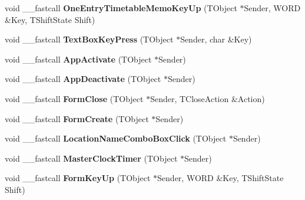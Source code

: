 \begin{DoxyCompactItemize}
\mbox{\label{class_t_interface_a8f417437f1683ddacce33c6e681571fc}} 
void \+\_\+\+\_\+fastcall {\bfseries One\+Entry\+Timetable\+Memo\+Key\+Up} (T\+Object $\ast$Sender, W\+O\+RD \&Key, T\+Shift\+State Shift)
\item 
\mbox{\label{class_t_interface_ad0ce61f7a8050fb57d19ebd049fa8b49}} 
void \+\_\+\+\_\+fastcall {\bfseries Text\+Box\+Key\+Press} (T\+Object $\ast$Sender, char \&Key)
\item 
\mbox{\label{class_t_interface_af99ae89b6c7a2d37bf49cf0b5fcc3f1f}} 
void \+\_\+\+\_\+fastcall {\bfseries App\+Activate} (T\+Object $\ast$Sender)
\item 
\mbox{\label{class_t_interface_a75f68c918750c0e007ea7a85d718e2ab}} 
void \+\_\+\+\_\+fastcall {\bfseries App\+Deactivate} (T\+Object $\ast$Sender)
\item 
\mbox{\label{class_t_interface_ad1418f26381a91c4333c3947585ed60e}} 
void \+\_\+\+\_\+fastcall {\bfseries Form\+Close} (T\+Object $\ast$Sender, T\+Close\+Action \&Action)
\item 
\mbox{\label{class_t_interface_a9cef18571e29b70d02ba9a92a830b3b8}} 
void \+\_\+\+\_\+fastcall {\bfseries Form\+Create} (T\+Object $\ast$Sender)
\item 
\mbox{\label{class_t_interface_a13fee6fa07e4a4e195e8b9c7dd303db0}} 
void \+\_\+\+\_\+fastcall {\bfseries Location\+Name\+Combo\+Box\+Click} (T\+Object $\ast$Sender)
\item 
\mbox{\label{class_t_interface_ace30a12d923fc7fb489afabb0a09aa4f}} 
void \+\_\+\+\_\+fastcall {\bfseries Master\+Clock\+Timer} (T\+Object $\ast$Sender)
\item 
\mbox{\label{class_t_interface_a84a1627edee1954b3938f45473c09bfd}} 
void \+\_\+\+\_\+fastcall {\bfseries Form\+Key\+Up} (T\+Object $\ast$Sender, W\+O\+RD \&Key, T\+Shift\+State Shift)
\item 
\mbox{\label{class_t_interface_a3fe45d91c5e85bb4359e5868110a9641}} 

\end{DoxyCompactItemize}
